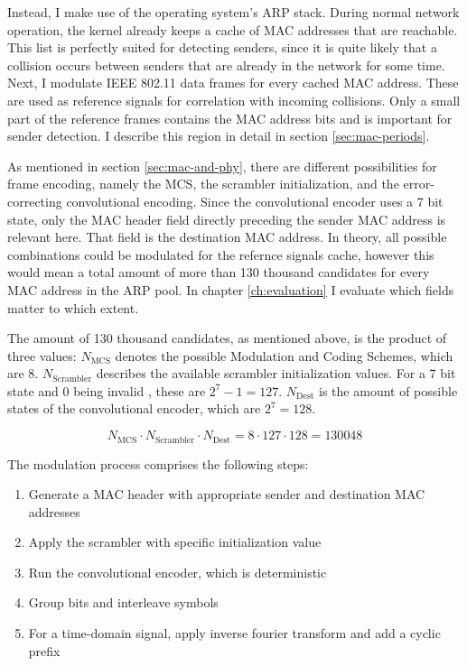 Instead, I make use of the operating system's ARP stack. During normal network operation, the kernel already keeps a cache of MAC addresses that are reachable. This list is perfectly suited for detecting senders, since it is quite likely that a collision occurs between senders that are already in the network for some time.\\

Next, I modulate IEEE 802.11 data frames for every cached MAC address. These are used as reference signals for correlation with incoming collisions. Only a small part of the reference frames contains the MAC address bits and is important for sender detection. I describe this region in detail in section \ref{sec:mac-periods}.

As mentioned in section \ref{sec:mac-and-phy}, there are different possibilities for frame encoding, namely the \gls{MCS}, the scrambler initialization, and the error-correcting convolutional encoding. Since the convolutional encoder uses a 7 bit state, only the MAC header field directly preceding the sender MAC address is relevant here. That field is the destination MAC address. In theory, all possible combinations could be modulated for the refernce signals cache, however this would mean a total amount of  more than 130 thousand candidates for every MAC address in the ARP pool. In chapter \ref{ch:evaluation} I evaluate which fields matter to which extent.

The amount of 130 thousand candidates, as mentioned above, is the product of three values: $ N_{\text{MCS}} $ denotes the possible Modulation and Coding Schemes, which are 8. $ N_{\text{Scrambler}} $ describes the available scrambler initialization values. For a 7 bit state and 0 being invalid \cite{ieee2012}, these are $ 2^7 - 1 = 127 $. $ N_{\text{Dest}} $ is the amount of possible states of the convolutional encoder, which are $ 2^7 = 128 $.

$$ N_{\text{MCS}} \cdot N_{\text{Scrambler}} \cdot N_{\text{Dest}} = 8 \cdot 127 \cdot 128 = 130 048 $$\vspace{0cm}

The modulation process comprises the following steps:

\begin{enumerate}
	\item Generate a MAC header with appropriate sender and destination MAC addresses
	\item Apply the scrambler with specific initialization value
	\item Run the convolutional encoder, which is deterministic
	\item Group bits and interleave symbols
	\item For a time-domain signal, apply inverse fourier transform and add a cyclic prefix
\end{enumerate}

